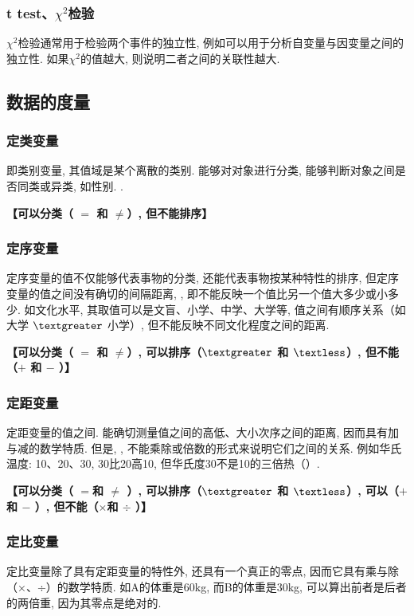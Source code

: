 \subsubsection{t test、$\chi^2$检验}
$\chi^2$检验通常用于检验两个事件的独立性, 例如可以用于分析自变量与因变量之间的独立性. 如果$\chi^2$的值越大, 则说明二者之间的关联性越大. 

\subsection{数据的度量}
\subsubsection{定类变量}
即类别变量, 其值域是某个离散的类别. 能够对对象进行分类, 能够判断对象之间是否同类或异类, 如性别. . 

\textbf{【可以分类（ $=$ 和 $\neq$）, 但不能排序】}

\subsubsection{定序变量}
定序变量的值不仅能够代表事物的分类, 还能代表事物按某种特性的排序, 但定序变量的值之间没有确切的间隔距离, , 即不能反映一个值比另一个值大多少或小多少. 如文化水平, 其取值可以是文盲、小学、中学、大学等, 值之间有顺序关系（如大学 $\textgreater$ 小学）, 但不能反映不同文化程度之间的距离. 

\textbf{【可以分类（ $=$ 和 $\neq$）, 可以排序（$\textgreater$ 和 $\textless$）, 但不能（$+$ 和 $-$ ）】}

\subsubsection{定距变量}
定距变量的值之间. 能确切测量值之间的高低、大小次序之间的距离, 因而具有加与减的数学特质. 但是, , 不能乘除或倍数的形式来说明它们之间的关系. 例如华氏温度: 10、20、30, 30比20高10, 但华氏度30不是10的三倍热（）. 

\textbf{【可以分类（ $=$和 $\neq$ ）, 可以排序（$\textgreater$ 和 $\textless$）, 可以（$+$ 和 $-$ ）, 但不能（$\times$和 $\div$ ）】}

\subsubsection{定比变量}
定比变量除了具有定距变量的特性外, 还具有一个真正的零点, 因而它具有乘与除（×、÷）的数学特质. 如A的体重是60kg, 而B的体重是30kg, 可以算出前者是后者的两倍重, 因为其零点是绝对的. 

